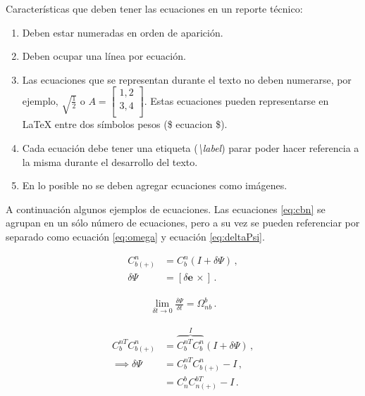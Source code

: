 \documentclass{article}
\begin{document}
Características que deben tener las ecuaciones en un reporte técnico:

\begin{enumerate}

    \item Deben estar numeradas en orden de aparición.
    
    \item Deben ocupar una línea por ecuación. 
    
    \item Las ecuaciones que se representan durante el texto no deben numerarse, por ejemplo, $ \sqrt{\frac{1}{2}} $ o 
    $ A = \begin{bmatrix} 1,2 \\ 3,4\\ \end{bmatrix} $. Estas ecuaciones pueden representarse en \LaTeX{} entre dos símbolos pesos (\$ ecuacion \$).
        
    \item Cada ecuación debe tener una etiqueta  (\emph{\textbackslash label}) parar poder hacer referencia a la misma durante el desarrollo del texto.
    
    \item En lo posible no se deben agregar ecuaciones como imágenes.

\end{enumerate}

A continuación algunos ejemplos de ecuaciones. Las ecuaciones \ref{eq:cbn} se agrupan en un sólo número de ecuaciones, pero a su vez se pueden referenciar por separado como ecuación \ref{eq:omega} y ecuación \ref{eq:deltaPsi}.

\begin{subequations} \label{eq:cbn}
	\begin{align} 
		\label{eq:omega}    C^n_{b(+)} &= C^n_{b} (I + {\delta \Psi})  \, , \\
		\label{eq:deltaPsi} \delta \Psi &= [ {\delta \boldsymbol e} \, \times ] \, .
	\end{align}
\end{subequations} 

\begin{align} \label{eq:limite}
\lim_{ \delta t \to 0} {\frac {\delta \Psi }{\delta t }} = {\Omega_{nb}^b} \, .
\end{align}

\begin{subequations} \label{eq:inc_psi}
	\begin{align}
	 C_{b}^{nT} C_{b(+)}^n  &= \overbrace{ C_{b}^{nT} C_{b}^n}^{I} ( I + {\delta \Psi} )  \, , \\
	 \implies {\delta \Psi} &= C_{b}^{nT} C_{b(+)}^n - I  \, , \\
							&= C_{n}^b    C_{n(+)}^{bT} - I \, .
	\end{align}
\end{subequations}
\end{document}
